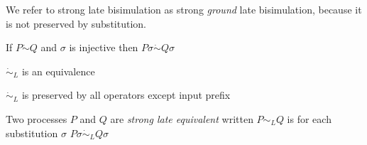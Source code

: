 We refer to strong late bisimulation as strong \emph{ground} late bisimulation, because it is not preserved by substitution.

\begin{proposition}
  If $P \dot{\sim} Q$ and $\sigma$ is injective then $P\sigma \dot{\sim} Q\sigma$
% 	
\end{proposition}

\begin{proposition}
  $\dot{\sim}_{L}$ is an equivalence
\end{proposition}

\begin{proposition}
  $\dot{\sim}_{L}$ is preserved by all operators except input prefix
\end{proposition}

\begin{definition}
  Two processes $P$ and $Q$ are \emph{strong late equivalent} written $P\sim_{L}Q$ is for each substitution $\sigma$ $P\sigma \dot{\sim}_{L}Q\sigma$
\end{definition}


